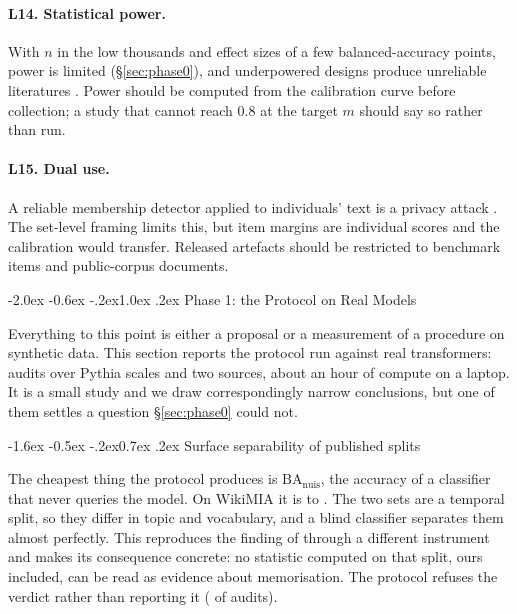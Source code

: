 \documentclass[10pt,twocolumn,letterpaper]{article}
\makeatletter
\renewcommand\section{\@startsection{section}{1}{\z@}%
  {-2.0ex \@plus -0.6ex \@minus -.2ex}{1.0ex \@plus .2ex}%
  {\normalfont\large\bfseries}}
\renewcommand\subsection{\@startsection{subsection}{2}{\z@}%
  {-1.6ex \@plus -0.5ex \@minus -.2ex}{0.7ex \@plus .2ex}%
  {\normalfont\normalsize\bfseries}}
\newcommand{\BA}{\mathrm{BA}}
\newcommand{\nuis}{\mathrm{nuis}}
\makeatother
\begin{document}
\paragraph{L14. Statistical power.} With $n$ in the low thousands and effect sizes of a few balanced-accuracy points, power is limited (\S\ref{sec:phase0}), and underpowered designs produce unreliable literatures \cite{card2020power,dror2018hitchhiker}. Power should be computed from the calibration curve before collection; a study that cannot reach $0.8$ at the target $m$ should say so rather than run.

\paragraph{L15. Dual use.} A reliable membership detector applied to individuals' text is a privacy attack \cite{carlini2021extracting,nasr2023scalable}. The set-level framing limits this, but item margins are individual scores and the calibration would transfer. Released artefacts should be restricted to benchmark items and public-corpus documents.

\section{Phase 1: the Protocol on Real Models}
\label{sec:phase1}

Everything to this point is either a proposal or a measurement of a procedure
on synthetic data. This section reports the protocol run against real
transformers: \PoneN{} audits over \PoneModels{} Pythia scales and two sources,
about an hour of compute on a laptop. It is a small study and we draw
correspondingly narrow conclusions, but one of them settles a question
\S\ref{sec:phase0} could not.



\subsection{Surface separability of published splits}

The cheapest thing the protocol produces is $\BA_{\nuis}$, the accuracy of a
classifier that never queries the model. On WikiMIA it is \PoneWkNuisLo{} to
\PoneWkNuisHi{}. The two sets are a temporal split, so they differ in topic and
vocabulary, and a blind classifier separates them almost perfectly. This
reproduces the finding of \citet{das2024blind} through a different instrument
and makes its consequence concrete: no statistic computed on that split, ours
included, can be read as evidence about memorisation. The protocol refuses the
verdict rather than reporting it (\PoneBlocked{} of \PoneN{} audits).
\end{document}
